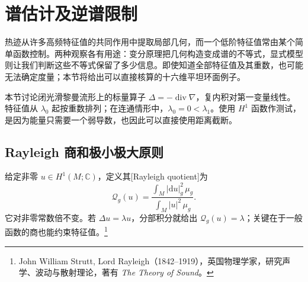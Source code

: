 
% 
% 
% 

\section{谱估计及逆谱限制}
\label{g3:sec:1604}

热迹从许多高频特征值的共同作用中提取局部几何，而一个低阶特征值常由某个简单函数控制。两种观察各有用途：变分原理把几何构造变成谱的不等式，显式模型则让我们判断这些不等式保留了多少信息。即使知道全部特征值及其重数，也可能无法确定度量；本节将给出可以直接核算的十六维平坦环面例子。

\ProseParagraphBreak

本节讨论闭光滑黎曼流形上的标量算子 \(\Delta=-\operatorname{div}\nabla\)，复内积对第一变量线性。特征值从 \(\lambda_0\) 起按重数排列；在连通情形中，\(\lambda_0=0<\lambda_1\)。使用 \(H^1\) 函数作测试，是因为能量只需要一个弱导数，也因此可以直接使用距离截断。

\subsection{Rayleigh 商和极小极大原则}
\label{g3:subsec:1604:01}
给定非零 \(u\in H^1(M;\mathbb C)\)，定义其[Rayleigh quotient]为
\[
	\mathscr Q_g(u)=\frac{\int_M|\mathrm du|_g^2\,\mu_g}{\int_M|u|^2\,\mu_g}.
\]
它对非零常数倍不变。若 \(\Delta u=\lambda u\)，分部积分就给出 \(\mathscr Q_g(u)=\lambda\)；关键在于一般函数的商也能约束特征值。\footnote{John William Strutt, Lord Rayleigh（1842--1919），英国物理学家，研究声学、波动与散射理论，著有 \emph{The Theory of Sound}。}

